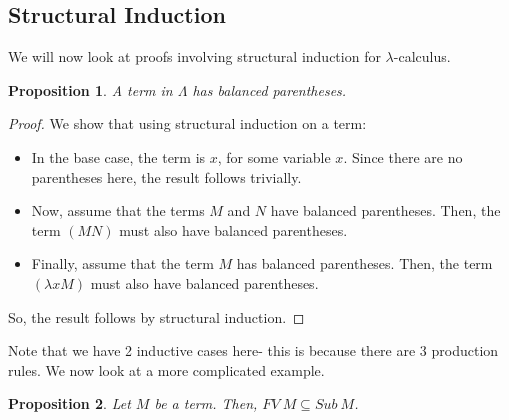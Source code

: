 \documentclass[a4paper, openany]{memoir}
\newtheorem{proposition}{Proposition}[section]
\theoremstyle{definition}
\begin{document}
    \subsection{Structural Induction}
    We will now look at proofs involving structural induction for $\lambda$-calculus.
    \begin{proposition}
        A term in $\Lambda$ has balanced parentheses.
    \end{proposition}
    \begin{proof}
        We show that using structural induction on a term:
        \begin{itemize}
            \item In the base case, the term is $x$, for some variable $x$. Since there are no parentheses here, the result follows trivially.
            \item Now, assume that the terms $M$ and $N$ have balanced parentheses. Then, the term $(MN)$ must also have balanced parentheses.
            \item Finally, assume that the term $M$ has balanced parentheses. Then, the term $(\lambda x M)$ must also have balanced parentheses.
        \end{itemize}
        So, the result follows by structural induction.
    \end{proof}
    \noindent Note that we have 2 inductive cases here- this is because there are 3 production rules. We now look at a more complicated example.
    \begin{proposition}
        Let $M$ be a term. Then, $FV \ M \subseteq Sub \ M$.
    \end{proposition}
\end{document}
